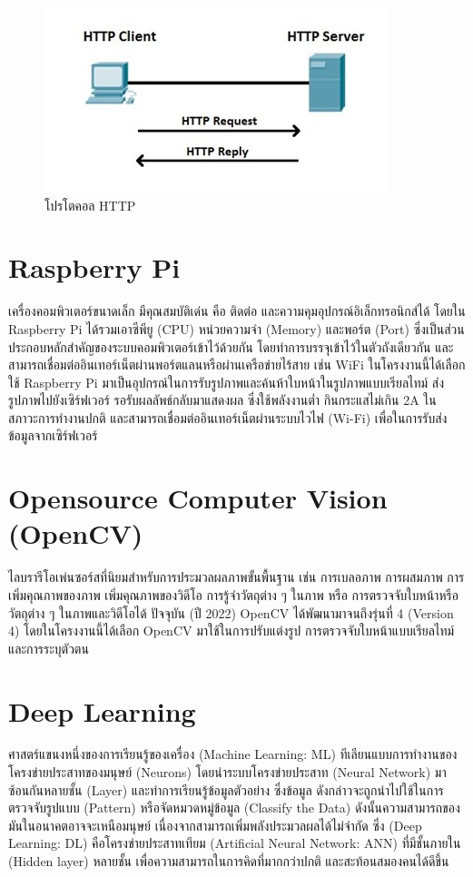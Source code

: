 \begin{figure}[!ht]
  \begin{center}
    \includegraphics[scale=.8]{pic/http.jpg}
    \caption[โปรโตคอล HTTP]{โปรโตคอล HTTP}
    \label{fig:http}
  \end{center}
\end{figure}

\section{Raspberry Pi}
เครื่องคอมพิวเตอร์ขนาดเล็ก มีคุณสมบัติเด่น คือ ติดต่อ และความคุมอุปกรณ์อิเล็กทรอนิกส์ได้ โดยใน Raspberry Pi 
ได้รวมเอาซีพียู (CPU) หน่วยความจำ (Memory) และพอร์ต (Port) ซึ่งเป็นส่วนประกอบหลักสำคัญของระบบคอมพิวเตอร์เข้าไว้ด้วยกัน 
โดยทำการบรรจุเข้าไว้ในตัวถังเดียวกัน และสามารถเชื่อมต่ออินเทอร์เน็ตผ่านพอร์ตแลนหรือผ่านเครือข่ายไร้สาย \cite{PI} เช่น WiFi
	ในโครงงานนี้ได้เลือกใช้ Raspberry Pi มาเป็นอุปกรณ์ในการรับรูปภาพและค้นห้าใบหน้าในรูปภาพแบบเรียลไทม์ ส่งรูปภาพไปยังเซิร์ฟเวอร์ 
รอรับผลลัพธ์กลับมาแสดงผล ซึ่งใช้พลังงานต่ำ กินกระแสไม่เกิน 2A ในสภาวะการทำงานปกติ และสามารถเชื่อมต่ออินเทอร์เน็ตผ่านระบบไวไฟ (Wi-Fi) 
เพื่อในการรับส่งข้อมูลจากเซิร์ฟเวอร์


\section{Opensource Computer Vision (OpenCV)}
ไลบรารีโอเพ่นซอร์สที่นิยมสำหรับการประมวลผลภาพขั้นพื้นฐาน เช่น การเบลอภาพ การผสมภาพ การเพิ่มคุณภาพของภาพ 
เพิ่มคุณภาพของวิดีโอ การรู้จำวัตถุต่าง ๆ ในภาพ หรือ การตรวจจับใบหน้าหรือวัตถุต่าง ๆ ในภาพและวิดีโอได้ 
ปัจจุบัน (ปี 2022) OpenCV ได้พัฒนามาจนถึงรุ่นที่ 4 (Version 4) โดยในโครงงานนี้ได้เลือก OpenCV มาใช้ในการปรับแต่งรูป 
การตรวจจับใบหน้าแบบเรียลไทม์ และการระบุตัวตน \cite{OpenCV}

\section{Deep Learning}
ศาสตร์แขนงหนึ่งของการเรียนรู้ของเครื่อง (Machine Learning: ML) ทีเลียนแบบการทำงานของโครงข่ายประสาทของมนุษย์ (Neurons) 
โดยนำระบบโครงข่ายประสาท (Neural Network) มาซ้อนกันหลายชั้น (Layer)
และทำการเรียนรู้ข้อมูลตัวอย่าง ซึ่งข้อมูล ดังกล่าวจะถูกนำไปใช้ในการตรวจจับรูปแบบ (Pattern) หรือจัดหมวดหมู่ข้อมูล (Classify the Data)
ดังนั้นความสามารถของมันในอนาคตอาจจะเหนือมนุษย์ เนื่องจากสามารถเพิ่มพลังประมวลผลได้ไม่จำกัด 
ซึ่ง (Deep Learning: DL) คือโครงข่ายประสาทเทียม (Artificial Neural Network: ANN) ที่มีชั้นภายใน (Hidden layer) หลายชั้น 
เพื่อความสามารถในการคิดที่มากกว่าปกติ และสะท้อนสมองคนได้ดีขึ้น \cite{DEEP}
\\

